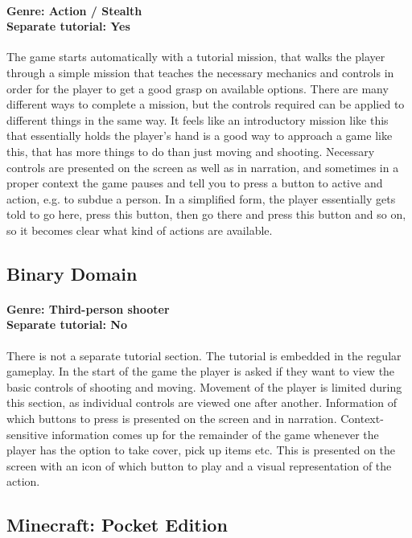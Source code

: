 \paragraph{Genre: Action / Stealth \\ Separate tutorial: Yes \\}
The game starts automatically with a tutorial mission, that walks the player through a simple mission that teaches the necessary mechanics and controls in order for the player to get a good grasp on available options. There are many different ways to complete a mission, but the controls required can be applied to different things in the same way. It feels like an introductory mission like this that essentially holds the player's hand is a good way to approach a game like this, that has more things to do than just moving and shooting. Necessary controls are presented on the screen as well as in narration, and sometimes in a proper context the game pauses and tell you to press a button to active and action, e.g. to subdue a person. In a simplified form, the player essentially gets told to go here, press this button, then go there and press this button and so on, so it becomes clear what kind of actions are available.

\subsection{Binary Domain}
\paragraph{Genre: Third-person shooter \\ Separate tutorial: No \\} 
There is not a separate tutorial section. The tutorial is embedded in the regular gameplay. In the start of the game the player is asked if they want to view the basic controls of shooting and moving. Movement of the player is limited during this section, as individual controls are viewed one after another. Information of which buttons to press is presented on the screen and in narration. Context-sensitive information comes up for the remainder of the game whenever the player has the option to take cover, pick up items etc. This is presented on the screen with an icon of which button to play and a visual representation of the action.

\subsection{Minecraft: Pocket Edition}

